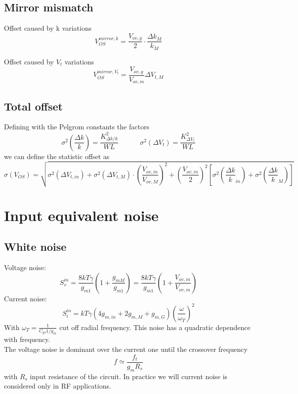 \subsection{Mirror mismatch}

Offset caused by k variations
\begin{equation}
V_{OS}^{mirror,k}=\frac{V_{ov,g}}{2}\cdot\frac{\Delta k_M}{k_M}
\end{equation}

Offset caused by $V_t$ variations 
\begin{equation}
V_{OS}^{mirror,V_t}=\frac{V_{ov,g}}{V_{ov,m}}\Delta V_{t,M}
\end{equation}

\subsection{Total offset}
Defining with the Pelgrom constants the factors
\begin{equation}
\sigma^2(\frac{\Delta k}{k})=\frac{K^2_{\Delta k/k}}{WL}\ \ \ \ \ \ \ \ \ \ \ \ \ \ \sigma^2(\Delta V_t)=\frac{K^2_{\Delta V_t}}{WL}
\end{equation}
we can define the statistic offset as 
\begin{equation}
\sigma(V_{OS})=\sqrt{\sigma^2(\Delta V_{t,in}) +\sigma^2(\Delta V_{t,M})\cdot \left(\frac{V_{ov,in}}{V_{ov,M}}\right)^2+\left(\frac{V_{ov,in}}{2}\right)^2[\sigma^2(\frac{\Delta k}{k}_{in})+\sigma^2(\frac{\Delta k}{k}_M)]}
\end{equation}


\section{Input equivalent noise}

\subsection{White noise}
Voltage noise: 
\begin{equation}
S_v^{in}=\frac{8kT\gamma}{g_{m1}}(1+\frac{g_{mM}}{g_{m1}})=\frac{8kT\gamma}{g_{m1}}(1+\frac{V_{ov,in}}{V_{ov,m}})
\end{equation}
Current noise:
\begin{equation}
S_i^{in}=kT\gamma(4g_{m,in}+2g_{m,M}+g_{m,G})(\frac{\omega}{\omega_T})^2
\end{equation}
With $\omega_T=\frac{1}{C_{gs}1/g_m}$ cut off radial frequency. This noise has a quadratic dependence with frequency.\\
The voltage noise is dominant over the current one until the crossover frequency
\begin{equation}
f\simeq \frac{f_t}{g_mR_s}
\end{equation}
with $R_s$ input resistance of the circuit. In practice we will current noise is considered only in RF applications.

